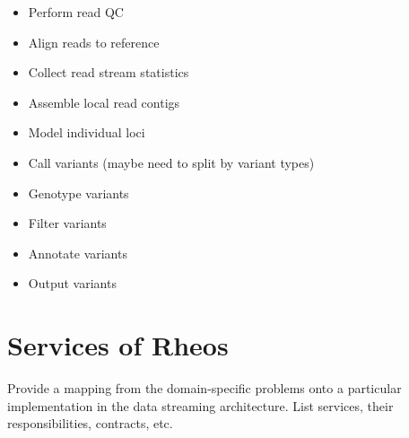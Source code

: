 \begin{itemize}
    \item Perform read QC
    \item Align reads to reference
    \item Collect read stream statistics
    \item Assemble local read contigs
    \item Model individual loci
    \item Call variants (maybe need to split by variant types)
    \item Genotype variants
    \item Filter variants
    \item Annotate variants
    \item Output variants
\end{itemize}


\section{Services of Rheos}

Provide a mapping from the domain-specific problems onto a particular implementation in the data streaming architecture. List services, their responsibilities, contracts, etc.

